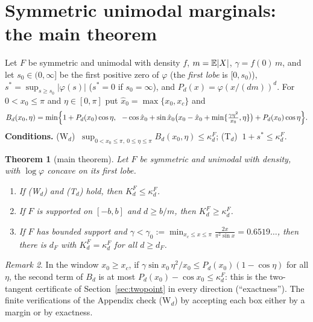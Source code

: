 \documentclass[11pt]{amsart}
\newtheorem{theorem}{Theorem}[section]\newtheorem{proposition}[theorem]{Proposition}\newtheorem{lemma}[theorem]{Lemma}
\theoremstyle{definition}\newtheorem{definition}[theorem]{Definition}\theoremstyle{remark}\newtheorem{remark}[theorem]{Remark}
\begin{document}
\section{Symmetric unimodal marginals: the main theorem}\label{sec:main}
Let $F$ be symmetric and unimodal with density $f$, $m=\mathbb E|X|$, $\gamma=f(0)\,m$, and let $s_0\in(0,\infty]$ be the first positive zero of $\varphi$ (the \emph{first lobe}
is $[0,s_0)$), $s^*=\sup_{s\ge s_0}|\varphi(s)|$ ($s^*=0$ if $s_0=\infty$), and $P_d(x)=\varphi(x/(dm))^d$. For $0<x_0\le\pi$ and $\eta\in[0,\pi]$ put $\hat x_0=\max\{x_0,x_c\}$ and
\[B_d(x_0,\eta)=\min\Bigl\{1+P_d(x_0)\cos\eta,\ \ -\cos\hat x_0+\sin\hat x_0\bigl(x_0-\hat x_0+\min\{\tfrac{\gamma\eta^2}{x_0},\eta\}\bigr)+P_d(x_0)\cos\eta\Bigr\}.\]
\noindent\textbf{Conditions.} (W$_d$) $\ \sup_{0<x_0\le\pi,\ 0\le\eta\le\pi}B_d(x_0,\eta)\le\kappa_d^F$; \quad (T$_d$) $\ 1+s^*\le\kappa_d^F$.
\begin{theorem}[main theorem]\label{thm:main}
Let $F$ be symmetric and unimodal with density, with $\log\varphi$ concave on its first lobe.
\begin{enumerate}
\item[(i)] If (W$_d$) and (T$_d$) hold, then $K_d^F\le\kappa_d^F$.
\item[(ii)] If $F$ is supported on $[-b,b]$ and $d\ge b/m$, then $K_d^F\ge\kappa_d^F$.
\item[(iii)] If $F$ has bounded support and $\gamma<\gamma_0:=\min_{x_c\le x\le\pi}\frac{2x}{\pi^2\sin x}=0.6519\ldots$, then there is $d_F$ with $K_d^F=\kappa_d^F$ for all $d\ge d_F$.
\end{enumerate}
\end{theorem}
\begin{remark}In the window $x_0\ge x_c$, if $\gamma\sin x_0\,\eta^2/x_0\le P_d(x_0)(1-\cos\eta)$ for all $\eta$, the second term of $B_d$ is at most $P_d(x_0)-\cos x_0\le\kappa_d^F$: this is
the two-tangent certificate of Section~\ref{sec:twopoint} in every direction (``exactness''). The finite verifications of the Appendix check (W$_d$) by
accepting each box either by a margin or by exactness.\end{remark}
\end{document}
